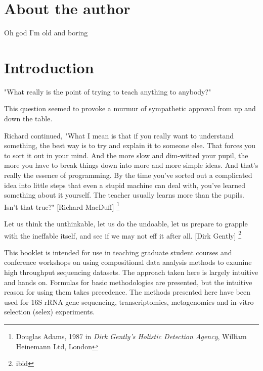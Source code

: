 \documentclass[onecolumn]{book}
\let\rmarkdownfootnote\footnote%
\def\footnote{\protect\rmarkdownfootnote}
\theoremstyle{definition}
\theoremstyle{definition}
\theoremstyle{definition}
\theoremstyle{remark}
\begin{document}
\hypertarget{about-the-author}{%
\chapter*{About the author}\label{about-the-author}}

Oh god I'm old and boring

\hypertarget{intro}{%
\chapter{Introduction}\label{intro}}

\hspace{2cm}\begin{minipage}[ct]{10cm}
\parskip=5pt
\parindent=5pt

"What really is the point of trying to teach anything to anybody?"

This question seemed to provoke a murmur of sympathetic approval from up and down the table.

 Richard continued, "What I mean is that if you really want to understand something, the best way is to try and explain it to someone else. That forces you to sort it out in your mind. And the more slow and dim-witted your pupil, the more you have to break things down into more and more simple ideas. And that's really the essence of programming. By the time you've sorted out a complicated idea into little steps that even a stupid machine can deal with, you've learned something about it yourself. The teacher usually learns more than the pupils. Isn't that true?" [Richard MacDuff] \footnote{Douglas Adams, 1987 in \emph{Dirk Gently's Holistic Detection Agency},  William Heinemann Ltd, London}

 \vspace{1cm}
 Let us think the unthinkable, let us do the undoable, let us prepare to grapple with the ineffable itself, and see if we may not eff it after all. [Dirk Gently] \footnote{ibid}

\end{minipage}

This booklet is intended for use in teaching graduate student courses
and conference workshops on using compositional data analysis methods to
examine high throughput sequencing datasets. The approach taken here is
largely intuitive and hands on. Formulas for basic methodologies are
presented, but the intuitive reason for using them takes precedence. The
methods presented here have been used for 16S rRNA gene sequencing,
transcriptomics, metagenomics and in-vitro selection (selex)
experiments.
\end{document}
